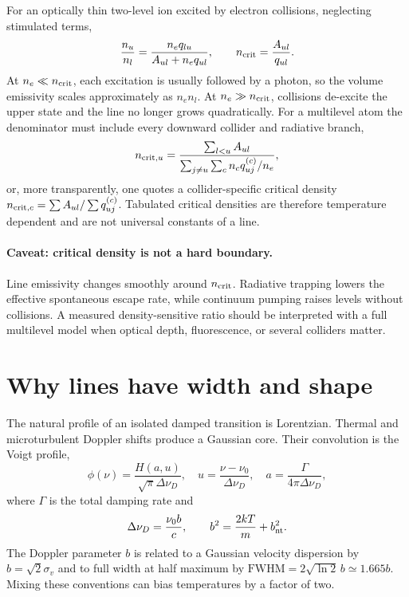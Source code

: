 For an optically thin two-level ion excited by electron collisions, neglecting
stimulated terms,
\begin{equation}
 \frac{n_u}{n_l}=\frac{n_eq_{lu}}{A_{ul}+n_eq_{ul}},
 \qquad n_{\rm crit}=\frac{A_{ul}}{q_{ul}}.
 \label{eq:two-level-atom}
\end{equation}
At $n_e\ll n_{\rm crit}$, each excitation is usually followed by a photon, so the
volume emissivity scales approximately as $n_en_l$.  At
$n_e\gg n_{\rm crit}$, collisions de-excite the upper state and the line no longer
grows quadratically.  For a multilevel atom the denominator must include every
downward collider and radiative branch,
\begin{equation}
 n_{{\rm crit},u}=\frac{\sum_{l<u}A_{ul}}
 {\sum_{j\ne u}\sum_c n_cq^{(c)}_{uj}/n_e},
 \label{eq:multilevel-critical-density}
\end{equation}
or, more transparently, one quotes a collider-specific critical density
$n_{{\rm crit},c}=\sum A_{ul}/\sum q^{(c)}_{uj}$.  Tabulated critical densities are
therefore temperature dependent and are not universal constants of a line.

\paragraph{Caveat: critical density is not a hard boundary.}
Line emissivity changes smoothly around $n_{\rm crit}$.  Radiative trapping lowers
the effective spontaneous escape rate, while continuum pumping raises levels without
collisions.  A measured density-sensitive ratio should be interpreted with a full
multilevel model when optical depth, fluorescence, or several colliders matter.

\section{Why lines have width and shape}

The natural profile of an isolated damped transition is Lorentzian.  Thermal and
microturbulent Doppler shifts produce a Gaussian core.  Their convolution is the
Voigt profile,
\begin{equation}
 \phi(\nu)=\frac{H(a,u)}{\sqrt{\pi}\Delta\nu_D},\quad
 u=\frac{\nu-\nu_0}{\Delta\nu_D},\quad
 a=\frac{\Gamma}{4\pi\Delta\nu_D},
 \label{eq:voigt-profile}
\end{equation}
where $\Gamma$ is the total damping rate and
\begin{equation}
 \Delta\nu_D=\frac{\nu_0b}{c},\qquad
 b^2=\frac{2kT}{m}+b_{\rm nt}^2.
 \label{eq:doppler-b}
\end{equation}
The Doppler parameter $b$ is related to a Gaussian velocity dispersion by
$b=\sqrt{2}\sigma_v$ and to full width at half maximum by
$\mathrm{FWHM}=2\sqrt{\ln2}\,b\simeq1.665b$.  Mixing these conventions can bias
temperatures by a factor of two.

